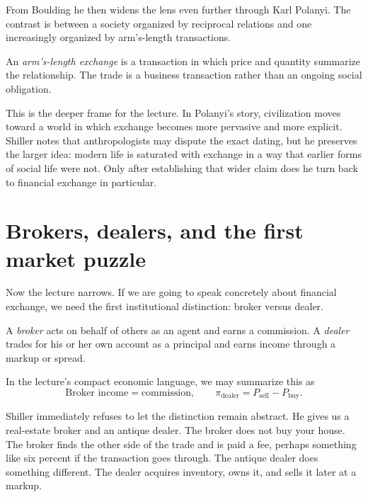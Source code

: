 From Boulding he then widens the lens even further through Karl Polanyi. The contrast is between a society organized by reciprocal relations and one increasingly organized by arm's-length transactions.

\begin{definition}
An \emph{arm's-length exchange} is a transaction in which price and quantity summarize the relationship. The trade is a business transaction rather than an ongoing social obligation.
\end{definition}

This is the deeper frame for the lecture. In Polanyi's story, civilization moves toward a world in which exchange becomes more pervasive and more explicit. Shiller notes that anthropologists may dispute the exact dating, but he preserves the larger idea: modern life is saturated with exchange in a way that earlier forms of social life were not. Only after establishing that wider claim does he turn back to financial exchange in particular.

\section{Brokers, dealers, and the first market puzzle}

Now the lecture narrows. If we are going to speak concretely about financial exchange, we need the first institutional distinction: broker versus dealer.

\begin{definition}
A \emph{broker} acts on behalf of others as an agent and earns a commission. A \emph{dealer} trades for his or her own account as a principal and earns income through a markup or spread.
\end{definition}

In the lecture's compact economic language, we may summarize this as
\begin{equation}
\text{Broker income} = \text{commission},
\qquad
\pi_{\text{dealer}} = P_{\text{sell}} - P_{\text{buy}}.
\end{equation}

Shiller immediately refuses to let the distinction remain abstract. He gives us a real-estate broker and an antique dealer. The broker does not buy your house. The broker finds the other side of the trade and is paid a fee, perhaps something like six percent if the transaction goes through. The antique dealer does something different. The dealer acquires inventory, owns it, and sells it later at a markup.

